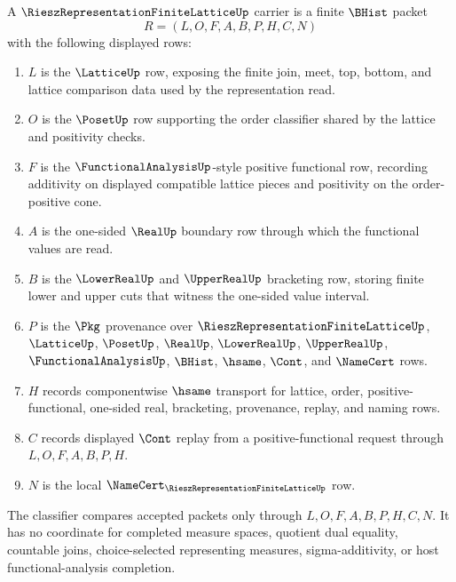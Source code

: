 \begin{definition}
\label{def:riesz-representation-finite-lattice-carrier}
A $\RieszRepresentationFiniteLatticeUp$ carrier is a finite $\BHist$ packet
$$
R=(L,O,F,A,B,P,H,C,N)
$$
with the following displayed rows:
\begin{enumerate}
\item $L$ is the $\LatticeUp$ row, exposing the finite join, meet, top, bottom, and lattice comparison data used by the representation read.
\item $O$ is the $\PosetUp$ row supporting the order classifier shared by the lattice and positivity checks.
\item $F$ is the $\FunctionalAnalysisUp$-style positive functional row, recording additivity on displayed compatible lattice pieces and positivity on the order-positive cone.
\item $A$ is the one-sided $\RealUp$ boundary row through which the functional values are read.
\item $B$ is the $\LowerRealUp$ and $\UpperRealUp$ bracketing row, storing finite lower and upper cuts that witness the one-sided value interval.
\item $P$ is the $\Pkg$ provenance over $\RieszRepresentationFiniteLatticeUp$, $\LatticeUp$, $\PosetUp$, $\RealUp$, $\LowerRealUp$, $\UpperRealUp$, $\FunctionalAnalysisUp$, $\BHist$, $\hsame$, $\Cont$, and $\NameCert$ rows.
\item $H$ records componentwise $\hsame$ transport for lattice, order, positive-functional, one-sided real, bracketing, provenance, replay, and naming rows.
\item $C$ records displayed $\Cont$ replay from a positive-functional request through $L,O,F,A,B,P,H$.
\item $N$ is the local $\NameCert_{\RieszRepresentationFiniteLatticeUp}$ row.
\end{enumerate}
The classifier compares accepted packets only through $L,O,F,A,B,P,H,C,N$. It has no coordinate for completed measure spaces, quotient dual equality, countable joins, choice-selected representing measures, sigma-additivity, or host functional-analysis completion.
\end{definition}

